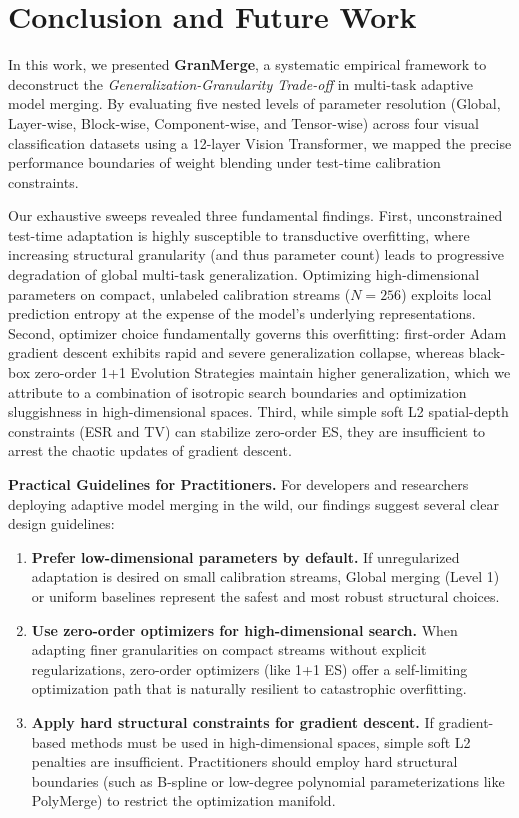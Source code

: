\section{Conclusion and Future Work}
\label{sec:conclusion}

In this work, we presented \textbf{GranMerge}, a systematic empirical framework to deconstruct the \emph{Generalization-Granularity Trade-off} in multi-task adaptive model merging. 
By evaluating five nested levels of parameter resolution (Global, Layer-wise, Block-wise, Component-wise, and Tensor-wise) across four visual classification datasets using a 12-layer Vision Transformer, we mapped the precise performance boundaries of weight blending under test-time calibration constraints.

Our exhaustive sweeps revealed three fundamental findings. 
First, unconstrained test-time adaptation is highly susceptible to transductive overfitting, where increasing structural granularity (and thus parameter count) leads to progressive degradation of global multi-task generalization. 
Optimizing high-dimensional parameters on compact, unlabeled calibration streams ($N=256$) exploits local prediction entropy at the expense of the model's underlying representations. 
Second, optimizer choice fundamentally governs this overfitting: first-order Adam gradient descent exhibits rapid and severe generalization collapse, whereas black-box zero-order 1+1 Evolution Strategies maintain higher generalization, which we attribute to a combination of isotropic search boundaries and optimization sluggishness in high-dimensional spaces. 
Third, while simple soft L2 spatial-depth constraints (ESR and TV) can stabilize zero-order ES, they are insufficient to arrest the chaotic updates of gradient descent.

\textbf{Practical Guidelines for Practitioners.} 
For developers and researchers deploying adaptive model merging in the wild, our findings suggest several clear design guidelines:
\begin{enumerate}
    \item \textbf{Prefer low-dimensional parameters by default.} If unregularized adaptation is desired on small calibration streams, Global merging (Level 1) or uniform baselines represent the safest and most robust structural choices.
    \item \textbf{Use zero-order optimizers for high-dimensional search.} When adapting finer granularities on compact streams without explicit regularizations, zero-order optimizers (like 1+1 ES) offer a self-limiting optimization path that is naturally resilient to catastrophic overfitting.
    \item \textbf{Apply hard structural constraints for gradient descent.} If gradient-based methods must be used in high-dimensional spaces, simple soft L2 penalties are insufficient. Practitioners should employ hard structural boundaries (such as B-spline or low-degree polynomial parameterizations like PolyMerge) to restrict the optimization manifold.
\end{enumerate}

